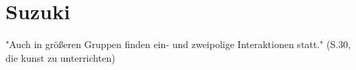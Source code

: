 \section{Suzuki}

"Auch in größeren Gruppen finden ein- und zweipolige Interaktionen statt."
(S.30, die kunst zu unterrichten)


